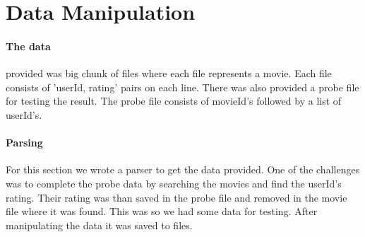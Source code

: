 \section{Data Manipulation}
\paragraph{The data} provided was big chunk of files where each file represents a movie.
Each file consists of 'userId, rating' pairs on each line.
There was also provided a probe file for testing the result.
The probe file consists of movieId's followed by a list of userId's.

\paragraph{Parsing}
For this section we wrote a parser to get the data provided.
One of the challenges was to complete the probe data by searching the movies and find the userId's rating.
Their rating was than saved in the probe file and removed in the movie file where it was found.
This was so we had some data for testing.
After manipulating the data it was saved to files.